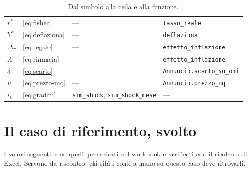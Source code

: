 \documentclass[11pt,a4paper]{article}
\theoremstyle{definition}
\theoremstyle{plain}
\begin{document}
\begin{table}[H]
\begin{tabular}{@{}llll@{}}
$r^*$ & \eqref{eq:fisher} & --- & \texttt{tasso\_reale} \\
$Y^*$ & \eqref{eq:deflaziona} & --- & \texttt{deflaziona} \\
$\Delta_\pi$ & \eqref{eq:regalo} & --- & \texttt{effetto\_inflazione} \\
$\Lambda$ & \eqref{eq:rinuncia} & --- & \texttt{effetto\_inflazione} \\
$\delta$ & \eqref{eq:scarto} & --- & \texttt{Annuncio.scarto\_su\_omi} \\
$u$ & \eqref{eq:prezzo-mq} & --- & \texttt{Annuncio.prezzo\_mq} \\
$i_k$ & \eqref{eq:gradini} & \texttt{sim\_shock}, \texttt{sim\_shock\_mese} & --- \\
\bottomrule
\end{tabular}
\caption{Dal simbolo alla cella e alla funzione.}
\end{table}

\section{Il caso di riferimento, svolto}

I valori seguenti sono quelli precaricati nel workbook e verificati con il ricalcolo di Excel. Servono da riscontro: chi rifà i conti a mano su questo caso deve ritrovarli.
\end{document}

